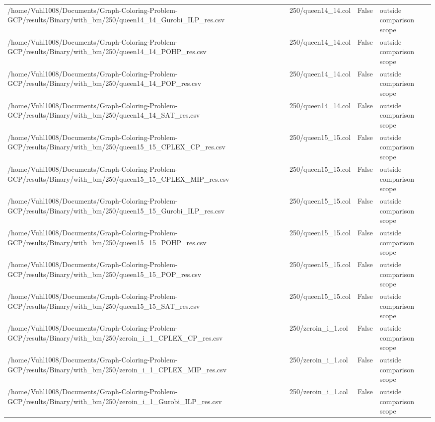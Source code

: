\begin{table}[htbp]
\begin{tabular}{llll}
/home/Vuhl1008/Documents/Graph-Coloring-Problem-GCP/results/Binary/with\_bm/250/queen14\_14\_Gurobi\_ILP\_res.csv & 250/queen14\_14.col & False & outside comparison scope \\
/home/Vuhl1008/Documents/Graph-Coloring-Problem-GCP/results/Binary/with\_bm/250/queen14\_14\_POHP\_res.csv & 250/queen14\_14.col & False & outside comparison scope \\
/home/Vuhl1008/Documents/Graph-Coloring-Problem-GCP/results/Binary/with\_bm/250/queen14\_14\_POP\_res.csv & 250/queen14\_14.col & False & outside comparison scope \\
/home/Vuhl1008/Documents/Graph-Coloring-Problem-GCP/results/Binary/with\_bm/250/queen14\_14\_SAT\_res.csv & 250/queen14\_14.col & False & outside comparison scope \\
/home/Vuhl1008/Documents/Graph-Coloring-Problem-GCP/results/Binary/with\_bm/250/queen15\_15\_CPLEX\_CP\_res.csv & 250/queen15\_15.col & False & outside comparison scope \\
/home/Vuhl1008/Documents/Graph-Coloring-Problem-GCP/results/Binary/with\_bm/250/queen15\_15\_CPLEX\_MIP\_res.csv & 250/queen15\_15.col & False & outside comparison scope \\
/home/Vuhl1008/Documents/Graph-Coloring-Problem-GCP/results/Binary/with\_bm/250/queen15\_15\_Gurobi\_ILP\_res.csv & 250/queen15\_15.col & False & outside comparison scope \\
/home/Vuhl1008/Documents/Graph-Coloring-Problem-GCP/results/Binary/with\_bm/250/queen15\_15\_POHP\_res.csv & 250/queen15\_15.col & False & outside comparison scope \\
/home/Vuhl1008/Documents/Graph-Coloring-Problem-GCP/results/Binary/with\_bm/250/queen15\_15\_POP\_res.csv & 250/queen15\_15.col & False & outside comparison scope \\
/home/Vuhl1008/Documents/Graph-Coloring-Problem-GCP/results/Binary/with\_bm/250/queen15\_15\_SAT\_res.csv & 250/queen15\_15.col & False & outside comparison scope \\
/home/Vuhl1008/Documents/Graph-Coloring-Problem-GCP/results/Binary/with\_bm/250/zeroin\_i\_1\_CPLEX\_CP\_res.csv & 250/zeroin\_i\_1.col & False & outside comparison scope \\
/home/Vuhl1008/Documents/Graph-Coloring-Problem-GCP/results/Binary/with\_bm/250/zeroin\_i\_1\_CPLEX\_MIP\_res.csv & 250/zeroin\_i\_1.col & False & outside comparison scope \\
/home/Vuhl1008/Documents/Graph-Coloring-Problem-GCP/results/Binary/with\_bm/250/zeroin\_i\_1\_Gurobi\_ILP\_res.csv & 250/zeroin\_i\_1.col & False & outside comparison scope \\

\end{tabular}
\end{table}
